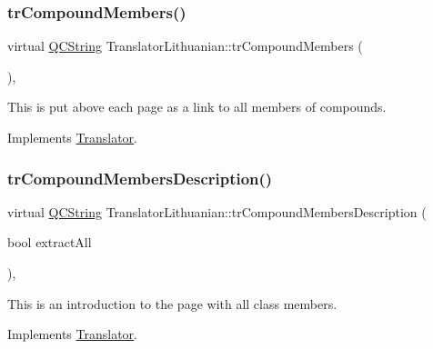 \subsubsection{\texorpdfstring{trCompoundMembers()}{trCompoundMembers()}}
{\footnotesize\ttfamily virtual \mbox{\hyperlink{class_q_c_string}{Q\+C\+String}} Translator\+Lithuanian\+::tr\+Compound\+Members (\begin{DoxyParamCaption}{ }\end{DoxyParamCaption})\hspace{0.3cm}{\ttfamily [inline]}, {\ttfamily [virtual]}}

This is put above each page as a link to all members of compounds. 

Implements \mbox{\hyperlink{class_translator}{Translator}}.

\mbox{\label{class_translator_lithuanian_a074478d68b80de77e3056afe89891318}} 
\subsubsection{\texorpdfstring{trCompoundMembersDescription()}{trCompoundMembersDescription()}}
{\footnotesize\ttfamily virtual \mbox{\hyperlink{class_q_c_string}{Q\+C\+String}} Translator\+Lithuanian\+::tr\+Compound\+Members\+Description (\begin{DoxyParamCaption}\item[{bool}]{extract\+All }\end{DoxyParamCaption})\hspace{0.3cm}{\ttfamily [inline]}, {\ttfamily [virtual]}}

This is an introduction to the page with all class members. 

Implements \mbox{\hyperlink{class_translator}{Translator}}.

\mbox{\label{class_translator_lithuanian_a5495e9bd0451125ca6948a20e7105239}} 

